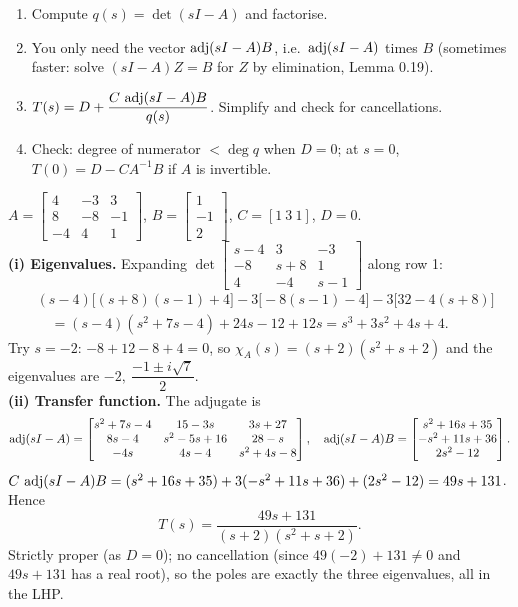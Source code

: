 \begin{methodbox}[title={Method: compute $T(s)$ for a SISO}]
\begin{enumerate}
\item Compute $q(s)=\det(sI-A)$ and factorise.
\item You only need the vector $\operatorname{adj}(sI-A)B$, i.e.\ $\operatorname{adj}(sI-A)$ times $B$ (sometimes faster: solve $(sI-A)Z=B$ for $Z$ by elimination, Lemma 0.19).
\item $T(s)=D+\dfrac{C\,\operatorname{adj}(sI-A)B}{q(s)}$. Simplify and check for cancellations.
\item Check: degree of numerator $<\deg q$ when $D=0$; at $s=0$, $T(0)=D-CA^{-1}B$ if $A$ is invertible.
\end{enumerate}
\end{methodbox}

\begin{workbox}[title={Worked example (AE2, A2.1)}]
$A=\begin{bmatrix}4&-3&3\\8&-8&-1\\-4&4&1\end{bmatrix}$, $B=\begin{bmatrix}1\\-1\\2\end{bmatrix}$, $C=[1\ 3\ 1]$, $D=0$.\\
\textbf{(i) Eigenvalues.} Expanding $\det\begin{bmatrix}s-4&3&-3\\-8&s+8&1\\4&-4&s-1\end{bmatrix}$ along row 1:
\begin{align*}&(s-4)\big[(s+8)(s-1)+4\big]-3\big[-8(s-1)-4\big]-3\big[32-4(s+8)\big]\\
&\quad=(s-4)(s^2+7s-4)+24s-12+12s=s^3+3s^2+4s+4.\end{align*}
Try $s=-2$: $-8+12-8+4=0$, so $\chi_A(s)=(s+2)(s^2+s+2)$ and the eigenvalues are $-2,\ \dfrac{-1\pm i\sqrt7}{2}$.\\
\textbf{(ii) Transfer function.} The adjugate is
\[\operatorname{adj}(sI-A)=\begin{bmatrix}s^2+7s-4&15-3s&3s+27\\8s-4&s^2-5s+16&28-s\\-4s&4s-4&s^2+4s-8\end{bmatrix},\quad
\operatorname{adj}(sI-A)B=\begin{bmatrix}s^2+16s+35\\-s^2+11s+36\\2s^2-12\end{bmatrix}.\]
$C\,\operatorname{adj}(sI-A)B=(s^2+16s+35)+3(-s^2+11s+36)+(2s^2-12)=49s+131$. Hence
\[\boxed{T(s)=\frac{49s+131}{(s+2)(s^2+s+2)}}.\]
Strictly proper (as $D=0$); no cancellation (since $49(-2)+131\neq0$ and $49s+131$ has a real root), so the poles are exactly the three eigenvalues, all in the LHP.
\end{workbox}

